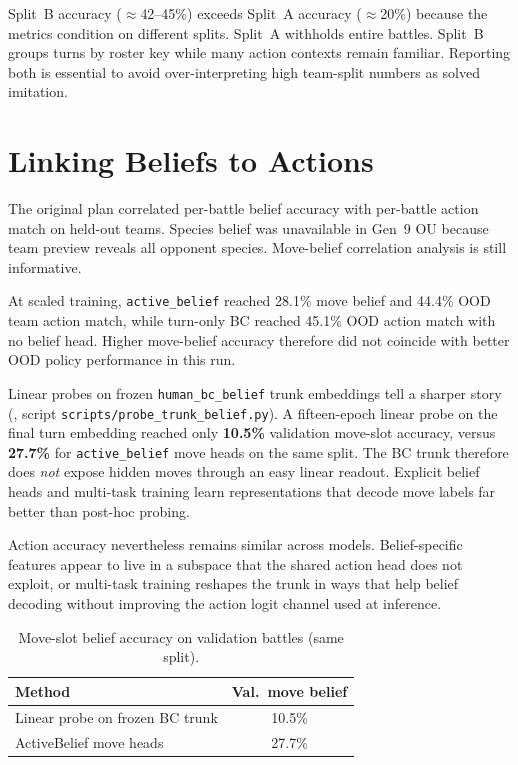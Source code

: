 Split~B accuracy ($\approx$42--45\%) exceeds Split~A accuracy ($\approx$20\%)
because the metrics condition on different splits. Split~A withholds entire
battles. Split~B groups turns by roster key while many action contexts remain
familiar. Reporting both is essential to avoid over-interpreting high team-split
numbers as solved imitation.

\section{Linking Beliefs to Actions}

The original plan correlated per-battle belief accuracy with per-battle action
match on held-out teams. Species belief was unavailable in Gen~9 OU because team
preview reveals all opponent species. Move-belief correlation analysis is still
informative.

At scaled training, \texttt{active\_belief} reached 28.1\% move belief and 44.4\%
OOD team action match, while turn-only BC reached 45.1\% OOD action match with no
belief head. Higher move-belief accuracy therefore did not coincide with better
OOD policy performance in this run.

Linear probes on frozen \texttt{human\_bc\_belief} trunk embeddings tell a
sharper story (, script
\texttt{scripts/probe\_trunk\_belief.py}). A fifteen-epoch linear probe on the
final turn embedding reached only \textbf{10.5\%} validation move-slot accuracy,
versus \textbf{27.7\%} for \texttt{active\_belief} move heads on the same split.
The BC trunk therefore does \emph{not} expose hidden moves through an easy linear
readout. Explicit belief heads and multi-task training learn representations that
decode move labels far better than post-hoc probing.

Action accuracy nevertheless remains similar across models. Belief-specific
features appear to live in a subspace that the shared action head does not
exploit, or multi-task training reshapes the trunk in ways that help belief
decoding without improving the action logit channel used at inference.

\begin{table}[ht]
  \centering
  \caption{Move-slot belief accuracy on validation battles (same split).}
  \label{tab:trunk-probe}
  \begin{tabular}{lc}
    \toprule
    Method & Val.\ move belief \\
    \midrule
    Linear probe on frozen BC trunk & 10.5\% \\
    ActiveBelief move heads & 27.7\% \\
    \bottomrule
  \end{tabular}
\end{table}

